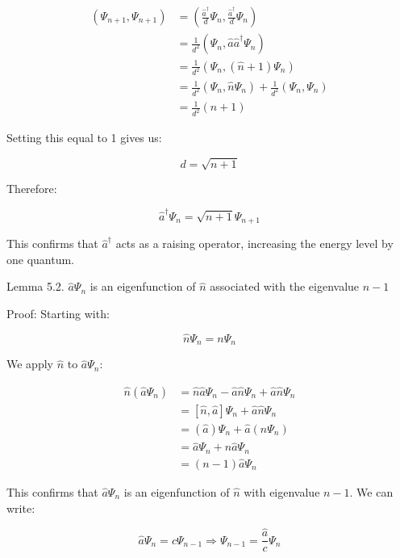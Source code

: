 \documentclass[italian]{HKNdocument}
\begin{document}
\begin{align*}
(\Psi_{n+1}, \Psi_{n+1}) &= \left(\frac{\hat{a}^\dagger}{d}\Psi_n, \frac{\hat{a}^\dagger}{d}\Psi_n\right) \\
&= \frac{1}{d^2}(\Psi_n, \hat{a}\hat{a}^\dagger\Psi_n) \\
&= \frac{1}{d^2}(\Psi_n, (\hat{n}+1)\Psi_n) \tag{5.26} \\
&= \frac{1}{d^2}(\Psi_n, \hat{n}\Psi_n) + \frac{1}{d^2}(\Psi_n, \Psi_n) \\
&= \frac{1}{d^2}(n+1)
\end{align*}

Setting this equal to 1 gives us:

\begin{equation*}
d = \sqrt{n+1} \tag{5.27}
\end{equation*}

Therefore:

\begin{equation*}
\hat{a}^\dagger\Psi_n = \sqrt{n+1}\Psi_{n+1} \tag{5.28}
\end{equation*}

This confirms that $\hat{a}^\dagger$ acts as a raising operator, increasing the energy level by one quantum.

Lemma 5.2. $\hat{a}\Psi_n$ is an eigenfunction of $\hat{n}$ associated with the eigenvalue $n-1$

Proof:
Starting with:

\begin{equation*}
\hat{n}\Psi_n = n\Psi_n \tag{5.29}
\end{equation*}

We apply $\hat{n}$ to $\hat{a}\Psi_n$:

\begin{align*}
\hat{n}(\hat{a}\Psi_n) &= \hat{n}\hat{a}\Psi_n - \hat{a}\hat{n}\Psi_n + \hat{a}\hat{n}\Psi_n \\
&= [\hat{n}, \hat{a}]\Psi_n + \hat{a}\hat{n}\Psi_n \\
&= (\hat{a})\Psi_n + \hat{a}(n\Psi_n) \tag{5.30} \\
&= \hat{a}\Psi_n + n\hat{a}\Psi_n \\
&= (n-1)\hat{a}\Psi_n
\end{align*}

This confirms that $\hat{a}\Psi_n$ is an eigenfunction of $\hat{n}$ with eigenvalue $n-1$. We can write:

\begin{equation*}
\hat{a}\Psi_n = c\Psi_{n-1} \Longrightarrow \Psi_{n-1} = \frac{\hat{a}}{c}\Psi_n \tag{5.31}
\end{equation*}
\end{document}
